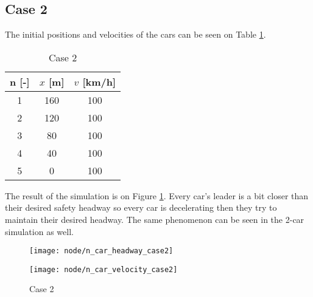 		\subsection*{Case 2}
		The initial positions and velocities of the cars can be seen on Table \ref{tab:node_case2}.
		\begin{table}
			\centering
			\begin{tabular}{ |c|c|c| }
				\hline
				n [-] & $x$ [m] & $v$ [km/h]\\
				\hline
				1 & 160 & 100 \\
				2 & 120 & 100 \\
				3 & 80 & 100 \\
				4 & 40 & 100 \\
				5 & 0 & 100 \\
				\hline
			\end{tabular}
			\caption{Case 2}
			\label{tab:node_case2}
		\end{table}
		The result of the simulation is on Figure \ref{fig:node_case2}. Every car's leader is a bit closer than their desired safety headway so every car is decelerating then they try to maintain their desired headway. The same phenomenon can be seen in the 2-car simulation as well.
		\begin{figure}
			\centering
			\begin{minipage}{.5\textwidth}
				\centering
				\texttt{[image: node/n\_car\_headway\_case2]}
			\end{minipage}\hfill
			\begin{minipage}{.5\textwidth}
				\centering
				\texttt{[image: node/n\_car\_velocity\_case2]}
			\end{minipage}
			\caption{Case 2}
			\label{fig:node_case2}
		\end{figure}
